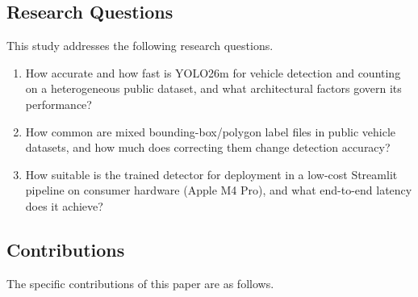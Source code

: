 \subsection{Research Questions}

This study addresses the following research questions.

\begin{enumerate}
\item[\textbf{RQ1.}]
  How accurate and how fast is YOLO26m for vehicle detection and counting on a
  heterogeneous public dataset, and what architectural factors govern its
  performance?

\item[\textbf{RQ2.}]
  How common are mixed bounding-box/polygon label files in public vehicle datasets,
  and how much does correcting them change detection accuracy?

\item[\textbf{RQ3.}]
  How suitable is the trained detector for deployment in a low-cost Streamlit
  pipeline on consumer hardware (Apple M4 Pro), and what end-to-end latency does
  it achieve?
\end{enumerate}

\subsection{Contributions}

The specific contributions of this paper are as follows.

